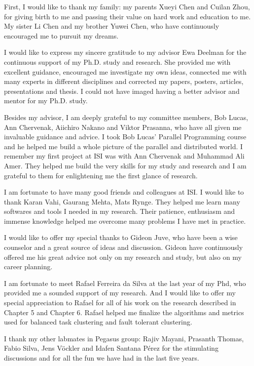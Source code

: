 
First, I would like to thank my family: my parents Xueyi Chen and Cuilan Zhou, for giving birth to me and passing their value on hard work and education to me. My sister Li Chen and my brother Yuwei Chen, who have continuously encouraged me to pursuit my dreams. 

I would like to express my sincere gratitude to my advisor Ewa Deelman for the continuous support of my Ph.D. study and research. She provided me with excellent guidance, encouraged me investigate my own ideas, connected me with many experts in different disciplines and corrected my papers, posters, articles, presentations and thesis. I could not have imaged having a better advisor and mentor for my Ph.D. study. 

Besides my advisor, I am deeply grateful to my committee members, Bob Lucas, Ann Chervenak, Aiichiro Nakano and Viktor Prasanna, who have all given me invaluable guidance and advice. I took Bob Lucas' Parallel Programming course and he helped me build a whole picture of the parallel and distributed world. I remember my first project at ISI was with Ann Chervenak and Muhammad Ali Amer. They helped me build the very skills for my study and research and I am grateful to them for enlightening me the first glance of research.

I am fortunate to have many good friends and colleagues at ISI. I would like to thank Karan Vahi, Gaurang Mehta, Mats Rynge. They helped me learn many softwares and tools I needed in my research. Their patience, enthusiasm and immense knowledge helped me overcome many problems I have met in practice. 

I would like to offer my special thanks to Gideon Juve, who have been a wise counselor and a great source of ideas and discussion.  Gideon have continuously offered me his great advice not only on my research and study, but also on my career planning. 

I am fortunate to meet Rafael Ferreira da Silva at the last year of my Phd, who provided me a sounded support of my research. 
And I would like to offer my special appreciation to Rafael for all of his work on the research described in Chapter 5 and Chapter 6. Rafael helped me finalize the algorithms and metrics used for balanced task clustering and fault tolerant clustering. 

I thank my other labmates in Pegasus group: Rajiv Mayani, Prasanth Thomas, Fabio Silva, Jens V\"{o}ckler and Idafen Santana P\'{e}rez for the stimulating discussions and for all the fun we have had in the last five years. 

